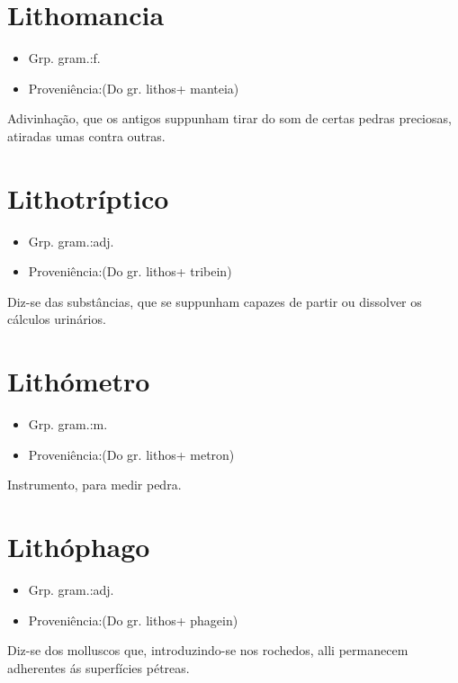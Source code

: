 \section{Lithomancia}
\begin{itemize}
\item {Grp. gram.:f.}
\end{itemize}
\begin{itemize}
\item {Proveniência:(Do gr. \textunderscore lithos\textunderscore  + \textunderscore manteia\textunderscore )}
\end{itemize}
Adivinhação, que os antigos suppunham tirar do som de certas pedras preciosas, atiradas umas contra outras.
\section{Lithotríptico}
\begin{itemize}
\item {Grp. gram.:adj.}
\end{itemize}
\begin{itemize}
\item {Proveniência:(Do gr. \textunderscore lithos\textunderscore  + \textunderscore tribein\textunderscore )}
\end{itemize}
Diz-se das substâncias, que se suppunham capazes de partir ou dissolver os cálculos urinários.
\section{Lithómetro}
\begin{itemize}
\item {Grp. gram.:m.}
\end{itemize}
\begin{itemize}
\item {Proveniência:(Do gr. \textunderscore lithos\textunderscore  + \textunderscore metron\textunderscore )}
\end{itemize}
Instrumento, para medir pedra.
\section{Lithóphago}
\begin{itemize}
\item {Grp. gram.:adj.}
\end{itemize}
\begin{itemize}
\item {Proveniência:(Do gr. \textunderscore lithos\textunderscore  + \textunderscore phagein\textunderscore )}
\end{itemize}
Diz-se dos molluscos que, introduzindo-se nos rochedos, alli permanecem adherentes ás superfícies pétreas.
